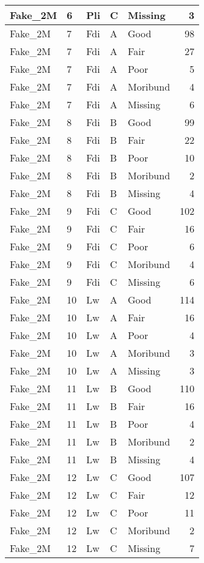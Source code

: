 \documentclass[
]{article}
\begin{document}
\begin{tabular}{l|l|l|l|l|r}
\hline
Fake\_2M & 6 & Pli & C & Missing & 3\\
\hline
Fake\_2M & 7 & Fdi & A & Good & 98\\
\hline
Fake\_2M & 7 & Fdi & A & Fair & 27\\
\hline
Fake\_2M & 7 & Fdi & A & Poor & 5\\
\hline
Fake\_2M & 7 & Fdi & A & Moribund & 4\\
\hline
Fake\_2M & 7 & Fdi & A & Missing & 6\\
\hline
Fake\_2M & 8 & Fdi & B & Good & 99\\
\hline
Fake\_2M & 8 & Fdi & B & Fair & 22\\
\hline
Fake\_2M & 8 & Fdi & B & Poor & 10\\
\hline
Fake\_2M & 8 & Fdi & B & Moribund & 2\\
\hline
Fake\_2M & 8 & Fdi & B & Missing & 4\\
\hline
Fake\_2M & 9 & Fdi & C & Good & 102\\
\hline
Fake\_2M & 9 & Fdi & C & Fair & 16\\
\hline
Fake\_2M & 9 & Fdi & C & Poor & 6\\
\hline
Fake\_2M & 9 & Fdi & C & Moribund & 4\\
\hline
Fake\_2M & 9 & Fdi & C & Missing & 6\\
\hline
Fake\_2M & 10 & Lw & A & Good & 114\\
\hline
Fake\_2M & 10 & Lw & A & Fair & 16\\
\hline
Fake\_2M & 10 & Lw & A & Poor & 4\\
\hline
Fake\_2M & 10 & Lw & A & Moribund & 3\\
\hline
Fake\_2M & 10 & Lw & A & Missing & 3\\
\hline
Fake\_2M & 11 & Lw & B & Good & 110\\
\hline
Fake\_2M & 11 & Lw & B & Fair & 16\\
\hline
Fake\_2M & 11 & Lw & B & Poor & 4\\
\hline
Fake\_2M & 11 & Lw & B & Moribund & 2\\
\hline
Fake\_2M & 11 & Lw & B & Missing & 4\\
\hline
Fake\_2M & 12 & Lw & C & Good & 107\\
\hline
Fake\_2M & 12 & Lw & C & Fair & 12\\
\hline
Fake\_2M & 12 & Lw & C & Poor & 11\\
\hline
Fake\_2M & 12 & Lw & C & Moribund & 2\\
\hline
Fake\_2M & 12 & Lw & C & Missing & 7\\

\end{tabular}
\end{document}
